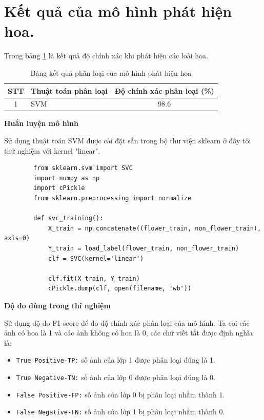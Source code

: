 \documentclass[12pt]{report}
\begin{document}
				
		
		\section{Kết quả của mô hình phát hiện hoa.}
		Trong bảng \ref{tbl:table ket qua detect flower} là kết quả độ chính xác khi phát hiện các loài hoa.
		\begin{table}[h]
			\centering
			\caption{Bảng kết quả phân loại của mô hình phát hiện hoa}
			\label{tbl:table ket qua detect flower}
			\begin{tabular}{|c|l|c|}
				\hline
				\textbf{STT} & \textbf{Thuật toán phân loại} & \textbf{Độ chính xác phân loại (\%)} \\ \hline
				1            & SVM                                 & 98.6                                         \\ \hline   			
			\end{tabular}
		\end{table}

		\textbf{Huấn luyện mô hình}
		
		Sử dụng thuật toán SVM được cài đặt sẵn trong bộ thư viện sklearn ở đây tôi thử nghiệm với kernel "linear".

		\begin{lstlisting}
		from sklearn.svm import SVC
		import numpy as np
		import cPickle
		from sklearn.preprocessing import normalize

		def svc_training():
			X_train = np.concatenate((flower_train, non_flower_train), axis=0)
			Y_train = load_label(flower_train, non_flower_train)
			clf = SVC(kernel='linear')

			clf.fit(X_train, Y_train)
			cPickle.dump(clf, open(filename, 'wb'))
		\end{lstlisting}


		\textbf{Độ đo dùng trong thí nghiệm}
		
		Sử dụng độ đo F1-score \cite{cia_f1_score} để đo độ chính xác phân loại của mô hình.
		Ta coi các ảnh có hoa là 1 và các ảnh không có hoa là 0, các chữ viết tắt được định nghĩa là: 
		\begin{itemize}
			\item \texttt{True Positive-TP:} số ảnh của lớp 1 được phân loại đúng là 1.
			\item \texttt{True Negative-TN:} số ảnh của lớp 0 được phân loại đúng là 0.
			\item \texttt{False Positive-FP:} số ảnh của lớp 0 bị phân loại nhầm thành 1.
			\item \texttt{False Negative-FN:} số ảnh của lớp 1 bị phân loại nhầm thành 0.
		\end{itemize}
\end{document}

